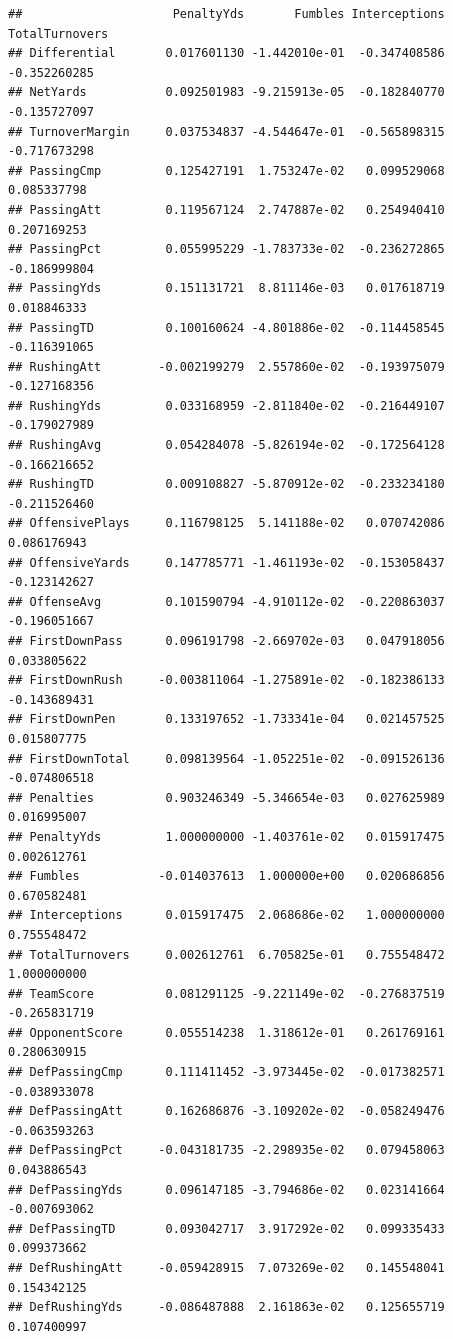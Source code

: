 \documentclass[
]{book}
\begin{document}
\begin{verbatim}
##                     PenaltyYds       Fumbles Interceptions TotalTurnovers
## Differential       0.017601130 -1.442010e-01  -0.347408586   -0.352260285
## NetYards           0.092501983 -9.215913e-05  -0.182840770   -0.135727097
## TurnoverMargin     0.037534837 -4.544647e-01  -0.565898315   -0.717673298
## PassingCmp         0.125427191  1.753247e-02   0.099529068    0.085337798
## PassingAtt         0.119567124  2.747887e-02   0.254940410    0.207169253
## PassingPct         0.055995229 -1.783733e-02  -0.236272865   -0.186999804
## PassingYds         0.151131721  8.811146e-03   0.017618719    0.018846333
## PassingTD          0.100160624 -4.801886e-02  -0.114458545   -0.116391065
## RushingAtt        -0.002199279  2.557860e-02  -0.193975079   -0.127168356
## RushingYds         0.033168959 -2.811840e-02  -0.216449107   -0.179027989
## RushingAvg         0.054284078 -5.826194e-02  -0.172564128   -0.166216652
## RushingTD          0.009108827 -5.870912e-02  -0.233234180   -0.211526460
## OffensivePlays     0.116798125  5.141188e-02   0.070742086    0.086176943
## OffensiveYards     0.147785771 -1.461193e-02  -0.153058437   -0.123142627
## OffenseAvg         0.101590794 -4.910112e-02  -0.220863037   -0.196051667
## FirstDownPass      0.096191798 -2.669702e-03   0.047918056    0.033805622
## FirstDownRush     -0.003811064 -1.275891e-02  -0.182386133   -0.143689431
## FirstDownPen       0.133197652 -1.733341e-04   0.021457525    0.015807775
## FirstDownTotal     0.098139564 -1.052251e-02  -0.091526136   -0.074806518
## Penalties          0.903246349 -5.346654e-03   0.027625989    0.016995007
## PenaltyYds         1.000000000 -1.403761e-02   0.015917475    0.002612761
## Fumbles           -0.014037613  1.000000e+00   0.020686856    0.670582481
## Interceptions      0.015917475  2.068686e-02   1.000000000    0.755548472
## TotalTurnovers     0.002612761  6.705825e-01   0.755548472    1.000000000
## TeamScore          0.081291125 -9.221149e-02  -0.276837519   -0.265831719
## OpponentScore      0.055514238  1.318612e-01   0.261769161    0.280630915
## DefPassingCmp      0.111411452 -3.973445e-02  -0.017382571   -0.038933078
## DefPassingAtt      0.162686876 -3.109202e-02  -0.058249476   -0.063593263
## DefPassingPct     -0.043181735 -2.298935e-02   0.079458063    0.043886543
## DefPassingYds      0.096147185 -3.794686e-02   0.023141664   -0.007693062
## DefPassingTD       0.093042717  3.917292e-02   0.099335433    0.099373662
## DefRushingAtt     -0.059428915  7.073269e-02   0.145548041    0.154342125
## DefRushingYds     -0.086487888  2.161863e-02   0.125655719    0.107400997

\end{verbatim}
\end{document}
